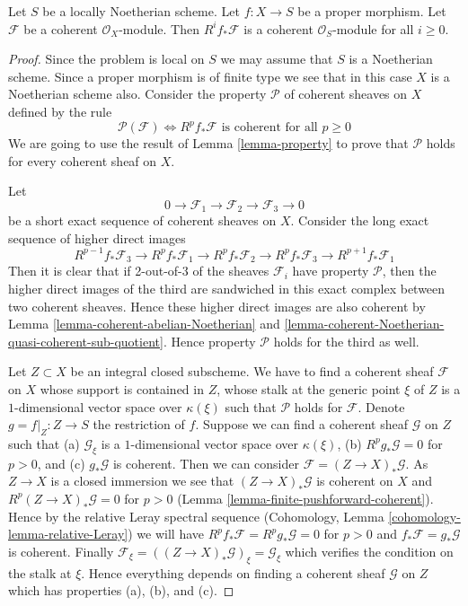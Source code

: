 \begin{proposition}
\label{proposition-proper-pushforward-coherent}
\begin{reference}
\cite[III Theorem 3.2.1]{EGA}
\end{reference}
Let $S$ be a locally Noetherian scheme.
Let $f : X \to S$ be a proper morphism.
Let $\mathcal{F}$ be a coherent $\mathcal{O}_X$-module.
Then $R^if_*\mathcal{F}$ is a coherent $\mathcal{O}_S$-module
for all $i \geq 0$.
\end{proposition}

\begin{proof}
Since the problem is local on $S$ we may assume that $S$ is
a Noetherian scheme. Since a proper morphism is of finite type
we see that in this case $X$ is a Noetherian scheme also.
Consider the property $\mathcal{P}$ of coherent sheaves
on $X$ defined by the rule
$$
\mathcal{P}(\mathcal{F}) \Leftrightarrow
R^pf_*\mathcal{F}\text{ is coherent for all }p \geq 0
$$
We are going to use the result of
Lemma \ref{lemma-property} to prove that
$\mathcal{P}$ holds for every coherent sheaf on $X$.

\medskip\noindent
Let
$$
0 \to \mathcal{F}_1 \to \mathcal{F}_2 \to \mathcal{F}_3 \to 0
$$
be a short exact sequence of coherent sheaves on $X$.
Consider the long exact sequence of higher direct images
$$
R^{p - 1}f_*\mathcal{F}_3 \to
R^pf_*\mathcal{F}_1 \to
R^pf_*\mathcal{F}_2 \to
R^pf_*\mathcal{F}_3 \to
R^{p + 1}f_*\mathcal{F}_1
$$
Then it is clear that if 2-out-of-3 of the sheaves $\mathcal{F}_i$
have property $\mathcal{P}$, then the higher direct images of the
third are sandwiched in this exact complex between two coherent
sheaves. Hence these higher direct images are also coherent by
Lemma \ref{lemma-coherent-abelian-Noetherian} and
\ref{lemma-coherent-Noetherian-quasi-coherent-sub-quotient}.
Hence property $\mathcal{P}$ holds for the third as well.

\medskip\noindent
Let $Z \subset X$ be an integral closed subscheme.
We have to find a coherent sheaf $\mathcal{F}$ on $X$ whose support is
contained in $Z$, whose stalk at the generic point $\xi$ of $Z$ is a
$1$-dimensional vector space over $\kappa(\xi)$ such that $\mathcal{P}$
holds for $\mathcal{F}$. Denote $g = f|_Z : Z \to S$ the restriction of $f$.
Suppose we can find a coherent sheaf $\mathcal{G}$ on $Z$ such
that
(a) $\mathcal{G}_\xi$ is a $1$-dimensional vector space over $\kappa(\xi)$,
(b) $R^pg_*\mathcal{G} = 0$ for $p > 0$, and
(c) $g_*\mathcal{G}$ is coherent. Then we can consider
$\mathcal{F} = (Z \to X)_*\mathcal{G}$. As $Z \to X$ is a closed immersion
we see that $(Z \to X)_*\mathcal{G}$ is coherent on $X$
and $R^p(Z \to X)_*\mathcal{G} = 0$ for $p > 0$
(Lemma \ref{lemma-finite-pushforward-coherent}).
Hence by the relative Leray spectral sequence
(Cohomology, Lemma \ref{cohomology-lemma-relative-Leray})
we will have $R^pf_*\mathcal{F} = R^pg_*\mathcal{G} = 0$ for $p > 0$
and $f_*\mathcal{F} = g_*\mathcal{G}$ is coherent.
Finally $\mathcal{F}_\xi = ((Z \to X)_*\mathcal{G})_\xi = \mathcal{G}_\xi$
which verifies the condition on the stalk at $\xi$.
Hence everything depends on finding a coherent sheaf $\mathcal{G}$
on $Z$ which has properties (a), (b), and (c).


\end{proof}
